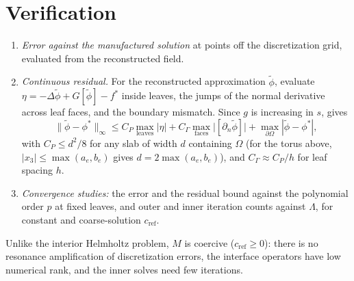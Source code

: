 \documentclass[11pt,a4paper]{article}
\theoremstyle{remark}\newtheorem{remark}{Remark}
\newcommand{\cR}{c_{\mathrm{ref}}}
\begin{document}
\section{Verification}
\begin{enumerate}
  \item \emph{Error against the manufactured solution} at points off the
    discretization grid, evaluated from the reconstructed field.
  \item \emph{Continuous residual.} For the reconstructed approximation
    $\tilde\phi$, evaluate $\eta=-\Delta\tilde\phi+G[\tilde\phi]-f^*$ inside
    leaves, the jumps of the normal derivative across leaf faces, and the
    boundary mismatch. Since $g$ is increasing in $s$,  gives
    \begin{equation}
      \|\tilde\phi-\phi^*\|_\infty\le C_P\max_{\text{leaves}}|\eta|
      +C_\Gamma\max_{\text{faces}}\big|[\partial_n\tilde\phi]\big|
      +\max_{\partial\Omega}|\tilde\phi-\phi^*| ,
    \end{equation}
    with $C_P\le d^2/8$ for any slab of width $d$ containing $\Omega$ (for the
    torus above, $|x_3|\le\max(a_e,b_e)$ gives $d=2\max(a_e,b_e)$), and
    $C_\Gamma\approx C_P/h$ for leaf spacing $h$.
  \item \emph{Convergence studies:} the error and the residual bound against
    the polynomial order $p$ at fixed leaves, and outer and inner iteration
    counts against $\Lambda$, for constant and coarse-solution $\cR$.
\end{enumerate}

Unlike the interior Helmholtz problem, $M$ is coercive ($\cR\ge0$): there is no
resonance amplification of discretization errors, the interface operators have
low numerical rank, and the inner solves need few iterations.
\end{document}
